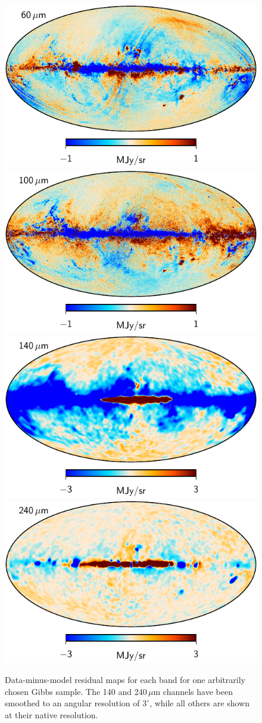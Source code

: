 \documentclass{aa}
\begin{document}
\begin{figure}
       	\includegraphics[width=0.35\linewidth]{figs/dirbe_07_todres_v4.pdf}
       	\includegraphics[width=0.35\linewidth]{figs/dirbe_08_todres_v4.pdf}\\       
       	\includegraphics[width=0.35\linewidth]{figs/dirbe_09_todres_3deg_v4.pdf}
       	\includegraphics[width=0.35\linewidth]{figs/dirbe_10_todres_3deg_v4.pdf}       
       	\caption{Data-minus-model residual maps for each band for one arbitrarily chosen Gibbs sample. The 140 and 240\,$\mu$m channels have been smoothed to an angular resolution of $3^{\circ}$, while all others are shown at their native resolution. }
       	\label{fig:res}
       \end{figure}
\end{document}

